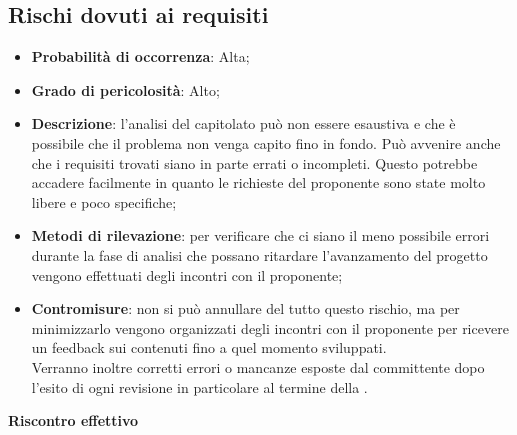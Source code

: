 	\subsection{Rischi dovuti ai requisiti} %
	\label{sub:rischi_dovuti_ai_requisiti}
		\begin{itemize}
			\item \textbf{Probabilità di occorrenza}: Alta;
			\item \textbf{Grado di pericolosità}: Alto;
			\item \textbf{Descrizione}: l'analisi del capitolato può non essere esaustiva e che è possibile che il problema non venga capito fino in fondo. Può avvenire anche che i requisiti trovati siano in parte errati o incompleti. Questo potrebbe accadere facilmente in quanto le richieste del proponente sono state molto libere e poco specifiche;
			\item \textbf{Metodi di rilevazione}: per verificare che ci siano il meno possibile errori durante la fase di analisi che possano ritardare l'avanzamento del progetto vengono effettuati degli incontri con il proponente;
			\item \textbf{Contromisure}: non si può annullare del tutto questo rischio, ma per minimizzarlo vengono organizzati degli incontri con il proponente per ricevere un feedback sui contenuti fino a quel momento sviluppati. \\
			Verranno inoltre corretti errori o mancanze esposte dal committente dopo l'esito di ogni revisione in particolare al termine della \RR.			
		\end{itemize}
	\noindent
	\textbf{Riscontro effettivo}
